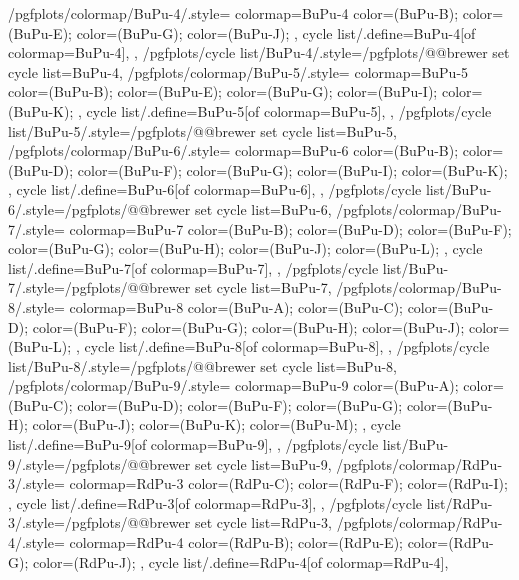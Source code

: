 {  %
  /pgfplots/colormap/BuPu-4/.style={
    colormap={BuPu-4}{
      color=(BuPu-B);
      color=(BuPu-E);
      color=(BuPu-G);
      color=(BuPu-J);
    },
    cycle list/.define={BuPu-4}{[of colormap=BuPu-4]},
  },
  /pgfplots/cycle list/BuPu-4/.style={/pgfplots/@@brewer set cycle list={BuPu-4}},
  /pgfplots/colormap/BuPu-5/.style={
    colormap={BuPu-5}{
      color=(BuPu-B);
      color=(BuPu-E);
      color=(BuPu-G);
      color=(BuPu-I);
      color=(BuPu-K);
    },
    cycle list/.define={BuPu-5}{[of colormap=BuPu-5]},
  },
  /pgfplots/cycle list/BuPu-5/.style={/pgfplots/@@brewer set cycle list={BuPu-5}},
  /pgfplots/colormap/BuPu-6/.style={
    colormap={BuPu-6}{
      color=(BuPu-B);
      color=(BuPu-D);
      color=(BuPu-F);
      color=(BuPu-G);
      color=(BuPu-I);
      color=(BuPu-K);
    },
    cycle list/.define={BuPu-6}{[of colormap=BuPu-6]},
  },
  /pgfplots/cycle list/BuPu-6/.style={/pgfplots/@@brewer set cycle list={BuPu-6}},
  /pgfplots/colormap/BuPu-7/.style={
    colormap={BuPu-7}{
      color=(BuPu-B);
      color=(BuPu-D);
      color=(BuPu-F);
      color=(BuPu-G);
      color=(BuPu-H);
      color=(BuPu-J);
      color=(BuPu-L);
    },
    cycle list/.define={BuPu-7}{[of colormap=BuPu-7]},
  },
  /pgfplots/cycle list/BuPu-7/.style={/pgfplots/@@brewer set cycle list={BuPu-7}},
  /pgfplots/colormap/BuPu-8/.style={
    colormap={BuPu-8}{
      color=(BuPu-A);
      color=(BuPu-C);
      color=(BuPu-D);
      color=(BuPu-F);
      color=(BuPu-G);
      color=(BuPu-H);
      color=(BuPu-J);
      color=(BuPu-L);
    },
    cycle list/.define={BuPu-8}{[of colormap=BuPu-8]},
  },
  /pgfplots/cycle list/BuPu-8/.style={/pgfplots/@@brewer set cycle list={BuPu-8}},
  /pgfplots/colormap/BuPu-9/.style={
    colormap={BuPu-9}{
      color=(BuPu-A);
      color=(BuPu-C);
      color=(BuPu-D);
      color=(BuPu-F);
      color=(BuPu-G);
      color=(BuPu-H);
      color=(BuPu-J);
      color=(BuPu-K);
      color=(BuPu-M);
    },
    cycle list/.define={BuPu-9}{[of colormap=BuPu-9]},
  },
  /pgfplots/cycle list/BuPu-9/.style={/pgfplots/@@brewer set cycle list={BuPu-9}},
  /pgfplots/colormap/RdPu-3/.style={
    colormap={RdPu-3}{
      color=(RdPu-C);
      color=(RdPu-F);
      color=(RdPu-I);
    },
    cycle list/.define={RdPu-3}{[of colormap=RdPu-3]},
  },
  /pgfplots/cycle list/RdPu-3/.style={/pgfplots/@@brewer set cycle list={RdPu-3}},
  /pgfplots/colormap/RdPu-4/.style={
    colormap={RdPu-4}{
      color=(RdPu-B);
      color=(RdPu-E);
      color=(RdPu-G);
      color=(RdPu-J);
    },
    cycle list/.define={RdPu-4}{[of colormap=RdPu-4]},
}}
